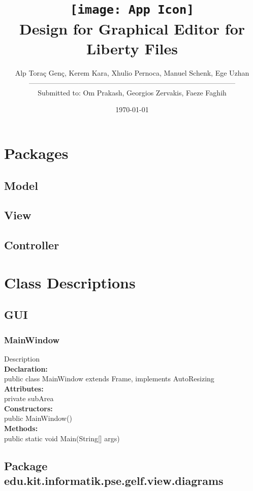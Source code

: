 \documentclass[10pt,a4paper]{report}
\title{\texttt{[image: App Icon]}\\Design for Graphical Editor for Liberty Files}
\author{Alp Toraç Genç, Kerem Kara, Xhulio Pernoca, Manuel Schenk, Ege Uzhan \leavevmode \\---------------------------------------------------------------------------------------\\
Submitted to: Om Prakash, Georgios Zervakis, Faeze Faghih}
\date{\today}
\newcommand{\public}{\textcolor{col:public}{public }}
\newcommand{\private}{\textcolor{col:private}{private }}
\newcommand{\class}{\textcolor{col:class}{class }}
\newcommand{\type}[1]{\textcolor{col:class}{#1}}
\newcommand{\extends}{\textcolor{col:sub}{extends }}
\newcommand{\implements}{\textcolor{col:impl}{implements }}
\newcommand{\static}{\textcolor{col:static}{static }}
\newcommand{\packagebeginning}{edu.kit.informatik.pse.gelf} %
\newcommand{\desc}[3]{
    #1{#2 #3}
}
\newcommand{\packagedesc}[1]{
    \desc{\section}{Package}{\packagebeginning.#1}
    \renewcommand{\contentsname}{\small\textit{Package contents}
    \hfill
    \small\textit{Page}}
    \setlength{\cftbeforetoctitleskip}{0em} %
    \setlength{\cftaftertoctitleskip}{0em} %
    \setlength{\cftsubsecindent}{1em} %
    \localtableofcontents %
}
\newcommand{\defineclass}[4]{
\textbf{Declaration:}
\\\indent #1
\\\textbf{Attributes:}
\\\indent#2
\\\textbf{Constructors:}
\\\indent#3
\\\textbf{Methods:}
\\\indent#4
}
\begin{document}
\maketitle
\label{sec:title}
\tableofcontents

\chapter{Packages}
    \section{Model}
    \section{View}
    \section{Controller}

\chapter{Class Descriptions}
\section{GUI}
\subsection{MainWindow}
Description
\\\defineclass{\public \class MainWindow \extends Frame, \implements AutoResizing}
{\private subArea}
{\public MainWindow()}
{\public \static \type{void} Main(\type{String[]} args)}

\packagedesc{view.diagrams}
\end{document}
